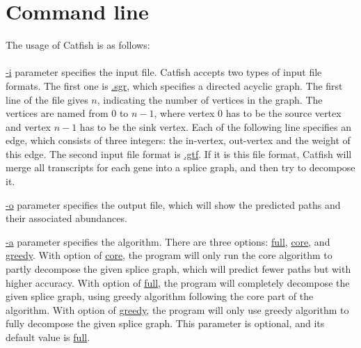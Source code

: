 \documentclass[letter,11pt]{article}
\begin{document}
\section{Command line}
The usage of Catfish is as follows:\\
\\

\url{-i} parameter specifies the input file.
Catfish accepts two types of input file formats. The first one is \url{.sgr},
which specifies a directed acyclic graph. The first line of the file gives
$n$, indicating the number of vertices in the graph. The vertices 
are named from $0$ to $n - 1$, where vertex 0 has to be the source vertex
and vertex $n - 1$ has to be the sink vertex. 
Each of the following line specifies an edge, which consists of three integers:
the in-vertex, out-vertex and the weight of this edge. The second input file format
is \url{.gtf}. If it is this file format, Catfish will merge all transcripts
for each gene into a splice graph, and then try to decompose it.

\url{-o} parameter specifies the output file, which will show the predicted paths
and their associated abundances.

\url{-a} parameter specifies the algorithm.
There are three options: \url{full}, \url{core}, and \url{greedy}.
With option of \url{core}, the program will only run the core algorithm to partly
decompose the given splice graph, which will predict fewer paths but with
higher accuracy. With option of \url{full}, the program will completely
decompose the given splice graph, using greedy algorithm following the core part of the algorithm.
With option of \url{greedy}, the program will only use greedy algorithm to fully decompose
the given splice graph. This parameter is optional, and its default value is \url{full}.
\end{document}

